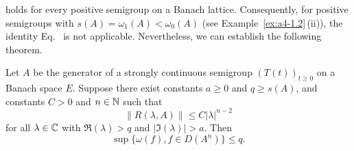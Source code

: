 holds for every positive semigroup on a Banach lattice. 
Consequently, for positive semigroups with $s(A) = \omega_1(A) < \omega_{0}(A)$ (see Example~\ref{ex:a4-1.2}\,(ii)), the identity Eq.~ is not applicable. 
Nevertheless, we can establish the following theorem.
\begin{theorem}\label{thm:a4-1.9}
Let $A$ be the generator of a strongly continuous semigroup $(T(t))_{t \geq 0}$ on a Banach space $E$. 
Suppose there exist constants $a \geq 0$ and $q \geq s(A)$, and constants $C > 0$ and $n \in \mathbb{N}$ such that 
\[
    \| R(\lambda, A) \| \leq C | \lambda |^{n-2}
\]
for all $\lambda \in \mathbb{C}$ with $\Re(\lambda) > q$ and $| \Im(\lambda) | > a$. 
Then
\[
    \sup \{ \omega(f),  f \in D(A^n) \} \leq q.
\]
\end{theorem}
